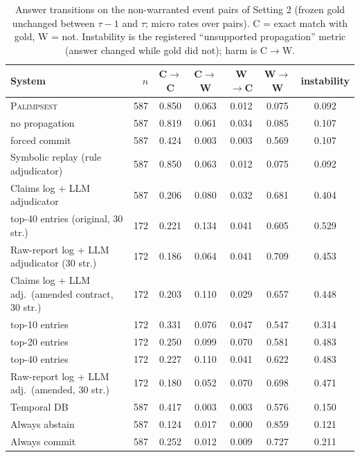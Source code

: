 \begin{table}[t]\centering\small
\caption{Answer transitions on the non-warranted event pairs of Setting 2 (frozen gold unchanged between $\tau-1$ and $\tau$; micro rates over pairs). C = exact match with gold, W = not. Instability is the registered ``unsupported propagation'' metric (answer changed while gold did not); harm is C$\to$W.}\label{tab:trans}
\begin{tabular}{lrcccc c}
\toprule
System & $n$ & C$\to$C & C$\to$W & W$\to$C & W$\to$W & instability \\
\midrule
\textsc{Palimpsest} & 587 & 0.850 & 0.063 & 0.012 & 0.075 & 0.092 \\
\quad no propagation & 587 & 0.819 & 0.061 & 0.034 & 0.085 & 0.107 \\
\quad forced commit & 587 & 0.424 & 0.003 & 0.003 & 0.569 & 0.107 \\
Symbolic replay (rule adjudicator) & 587 & 0.850 & 0.063 & 0.012 & 0.075 & 0.092 \\
Claims log + LLM adjudicator & 587 & 0.206 & 0.080 & 0.032 & 0.681 & 0.404 \\
\quad top-40 entries (original, 30 str.) & 172 & 0.221 & 0.134 & 0.041 & 0.605 & 0.529 \\
Raw-report log + LLM adjudicator (30 str.) & 172 & 0.186 & 0.064 & 0.041 & 0.709 & 0.453 \\
Claims log + LLM adj.\ (amended contract, 30 str.) & 172 & 0.203 & 0.110 & 0.029 & 0.657 & 0.448 \\
\quad top-10 entries & 172 & 0.331 & 0.076 & 0.047 & 0.547 & 0.314 \\
\quad top-20 entries & 172 & 0.250 & 0.099 & 0.070 & 0.581 & 0.483 \\
\quad top-40 entries & 172 & 0.227 & 0.110 & 0.041 & 0.622 & 0.483 \\
Raw-report log + LLM adj.\ (amended, 30 str.) & 172 & 0.180 & 0.052 & 0.070 & 0.698 & 0.471 \\
Temporal DB & 587 & 0.417 & 0.003 & 0.003 & 0.576 & 0.150 \\
Always abstain & 587 & 0.124 & 0.017 & 0.000 & 0.859 & 0.121 \\
Always commit & 587 & 0.252 & 0.012 & 0.009 & 0.727 & 0.211 \\
\bottomrule
\end{tabular}
\end{table}